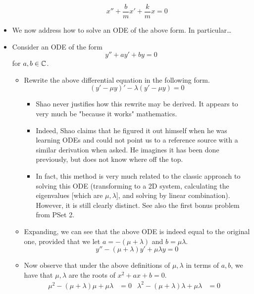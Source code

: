 \documentclass[../notes.tex]{subfiles}
\begin{document}
\begin{itemize}
\begin{itemize}
        \begin{equation*}
            x''+\frac{b}{m}x'+\frac{k}{m}x = 0
        \end{equation*}
    \end{itemize}
    \item We now address how to solve an ODE of the above form. In particular\dots
    \item Consider an ODE of the form
    \begin{equation*}
        y''+ay'+by = 0
    \end{equation*}
    for $a,b\in\mathbb{C}$.
    \begin{itemize}
        \item Rewrite the above differential equation in the following form.
        \begin{equation*}
            (y'-\mu y)'-\lambda(y'-\mu y) = 0
        \end{equation*}
        \begin{itemize}
            \item Shao never justifies how this rewrite may be derived. It appears to very much be "because it works" mathematics.
            \item Indeed, Shao claims that he figured it out himself when he was learning ODEs and could not point us to a reference source with a similar derivation when asked. He imagines it has been done previously, but does not know where off the top.
            \item In fact, this method is very much related to the classic approach to solving this ODE (transforming to a 2D system, calculating the eigenvalues [which are $\mu,\lambda$], and solving by linear combination). However, it is still clearly distinct. See also the first bonus problem from PSet 2.
        \end{itemize}
        \item Expanding, we can see that the above ODE is indeed equal to the original one, provided that we let $a=-(\mu+\lambda)$ and $b=\mu\lambda$.
        \begin{equation*}
            y''-(\mu+\lambda)y'+\mu\lambda y = 0
        \end{equation*}
        \item Now observe that under the above definitions of $\mu,\lambda$ in terms of $a,b$, we have that $\mu,\lambda$ are the roots of $x^2+ax+b=0$.
        \begin{align*}
            \mu^2-(\mu+\lambda)\mu+\mu\lambda &= 0&
            \lambda^2-(\mu+\lambda)\lambda+\mu\lambda &= 0&

\end{align*}
\end{itemize}
\end{itemize}
\end{document}
